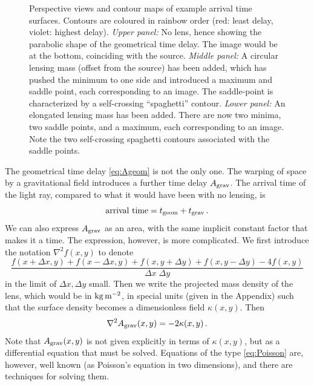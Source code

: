 \begin{figure}
\caption{Perspective views and contour maps of example arrival time
  surfaces.  Contours are coloured in rainbow order (red: least delay,
  violet: highest delay).  {\em Upper panel:\/} No lens, hence showing
  the parabolic shape of the geometrical time delay.  The image would
  be at the bottom, coinciding with the source. {\em Middle panel:\/}
  A circular lensing mass (offset from the source) has been added,
  which has pushed the minimum to one side and introduced a maximum
  and saddle point, each corresponding to an image.  The saddle-point
  is characterized by a self-crossing ``spaghetti'' contour. {\em
    Lower panel:\/} An elongated lensing mass has been added.  There
  are now two minima, two saddle points, and a maximum, each
  corresponding to an image.  Note the two self-crossing spaghetti
  contours associated with the saddle points.}
\label{fig:arriv}
\end{figure}

The geometrical time delay \eqref{eq:Ageom} is not the only one.  The
warping of space by a gravitational field introduces a further time
delay $A_{\rm grav}$.  The arrival time of the light ray, compared to
what it would have been with no lensing, is
\begin{equation} \label{eq:Aarriv}
\hbox{arrival time} = t_{\rm geom} + t_{\rm grav} \,.
\end{equation}
We can also express $A_{\rm grav}$ as an area, with the same implicit
constant factor that makes it a time.  The expression, however, is
more complicated.  We first introduce the notation $\nabla^2 f(x,y)$
to denote
\begin{equation}
 \frac{ f(x+\Delta x, y) + f(x-\Delta x, y) +
        f(x, y+\Delta y) + f(x, y-\Delta y) - 4 f(x,y) }
      {\Delta x \; \Delta y}
\end{equation}
in the limit of $\Delta x,\Delta y$ small.  Then we write the
projected mass density of the lens, which would be in $\rm
kg\,m^{-2}$, in special units (given in the Appendix) such that the
surface density becomes a dimensionless field $\kappa(x,y)$.  Then
\begin{equation} \label{eq:Poisson}
\nabla^2 A_{\rm grav}(x,y) = -2\kappa(x,y) \,.
\end{equation}
Note that $A_{\rm grav}(x,y)$ is not given explicitly in terms of
$\kappa(x,y)$, but as a differential equation that must be solved.
Equations of the type \eqref{eq:Poisson} are, however, well known (as
Poisson's equation in two dimensions), and there are techniques for
solving them.  

